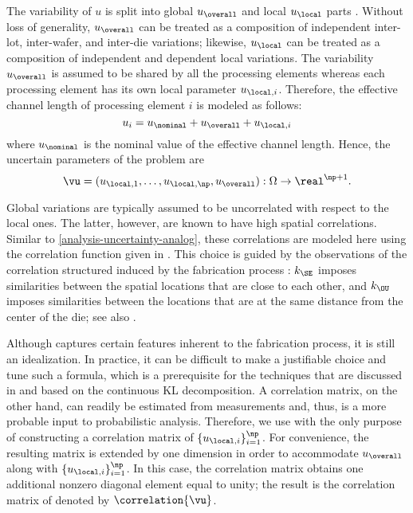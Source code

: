 The variability of $u$ is split into global $u_\overall$ and local $u_\local$
parts \cite{shen2009, chandra2010}. Without loss of generality, $u_\overall$ can
be treated as a composition of independent inter-lot, inter-wafer, and inter-die
variations; likewise, $u_\local$ can be treated as a composition of independent
and dependent local variations. The variability $u_\overall$ is assumed to be
shared by all the \np processing elements whereas each processing element has
its own local parameter $u_{\local, i}$. Therefore, the effective channel length
of processing element $i$ is modeled as follows:
\[
  u_i = u_\nominal + u_\overall + u_{\local, i}
\]
where $u_\nominal$ is the nominal value of the effective channel length. Hence,
the uncertain parameters of the problem are
\[
  \vu = (u_{\local, 1}, \dotsc, u_{\local, \np}, u_\overall): \Omega \to \real^{\np + 1}.
\]

Global variations are typically assumed to be uncorrelated with respect to the
local ones. The latter, however, are known to have high spatial correlations.
Similar to \cref{analysis-uncertainty-analog}, these correlations are modeled
here using the correlation function given in . This
choice is guided by the observations of the correlation structured induced by
the fabrication process \cite{friedberg2005, chandrakasan2000, cheng2011}:
$k_\SE$ imposes similarities between the spatial locations that are close to
each other, and $k_\OU$ imposes similarities between the locations that are at
the same distance from the center of the die; see also \cite{ghanem1991,
ghanta2006, bhardwaj2008, huang2009a, lee2013}.

Although  captures certain features inherent to the
fabrication process, it is still an idealization. In practice, it can be
difficult to make a justifiable choice and tune such a formula, which is a
prerequisite for the techniques that are discussed in  and
based on the continuous \ac{KL} decomposition. A correlation matrix, on the
other hand, can readily be estimated from measurements and, thus, is a more
probable input to probabilistic analysis. Therefore, we use
 with the only purpose of constructing a correlation
matrix of $\{ u_{\local, i} \}_{i = 1}^\np$. For convenience, the resulting
matrix is extended by one dimension in order to accommodate $u_\overall$ along
with $\{ u_{\local, i} \}_{i = 1}^\np$. In this case, the correlation matrix
obtains one additional nonzero diagonal element equal to unity; the result is
the correlation matrix of \vu denoted by $\correlation{\vu}$.

